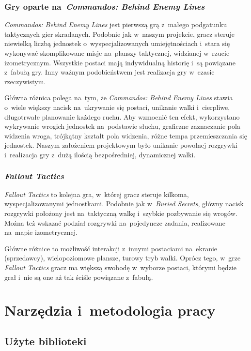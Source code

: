 \documentclass[licencjacka]{pracamgr}
\begin{document}
    \subsection{Gry oparte na~\emph{Commandos: Behind Enemy Lines}}
      \emph{Commandos: Behind Enemy Lines}\cite{CBEL} jest pierwszą grą z~małego podgatunku taktycznych gier skradanych.
      Podobnie jak w~naszym projekcie, gracz steruje niewielką liczbą jednostek o~wyspecjalizowanych umiejętnościach
      i~stara się wykonywać skomplikowane misje na~planszy taktycznej, widzianej w~rzucie izometrycznym. Wszystkie postaci
      mają indywidualną historię i~są powiązane z~fabułą gry. Inny ważnym podobieństwem jest realizacja gry w~czasie
      rzeczywistym.

      Główna różnica polega na~tym, że \emph{Commandos: Behind Enemy Lines} stawia o~wiele większy nacisk na~ukrywanie
      się postaci, unikanie walki i~cierpliwe, długotrwałe planowanie każdego ruchu. Aby wzmocnić ten efekt, wykorzystano
      wykrywanie wrogich jednostek na~podstawie słuchu, graficzne zaznaczanie pola widzenia wroga, trójkątny kształt pola
      widzenia, różne tempa przemieszczania się jednostek. Naszym założeniem projektowym było unikanie powolnej rozgrywki
      i~realizacja gry z~dużą ilością bezpośredniej, dynamicznej walki.

    \subsection{\emph{Fallout Tactics}\cite{FT}}
      \emph{Fallout Tactics}\cite{FT} to kolejna gra, w~której gracz steruje kilkoma, wyspecjalizowanymi jednostkami.
      Podobnie jak w~\emph{Buried Secrets}, główny nacisk rozgrywki położony jest na~taktyczną walkę i~szybkie pozbywanie
      się wrogów. Można też wskazać podział rozgrywki na~pojedyncze zadania, realizowane na~mapie izometrycznej.

      Główne różnice to możliwość interakcji z~innymi postaciami na~ekranie (sprzedawcy), wielopoziomowe plansze,
      turowy tryb walki. Oprócz tego, w~grze \emph{Fallout Tactics} gracz ma większą swobodę w~wyborze postaci, którymi
      będzie grał i~nie są one aż tak ściśle powiązane z~fabułą.

\chapter{Narzędzia i~metodologia pracy}
  \section{Użyte biblioteki}
\end{document}
